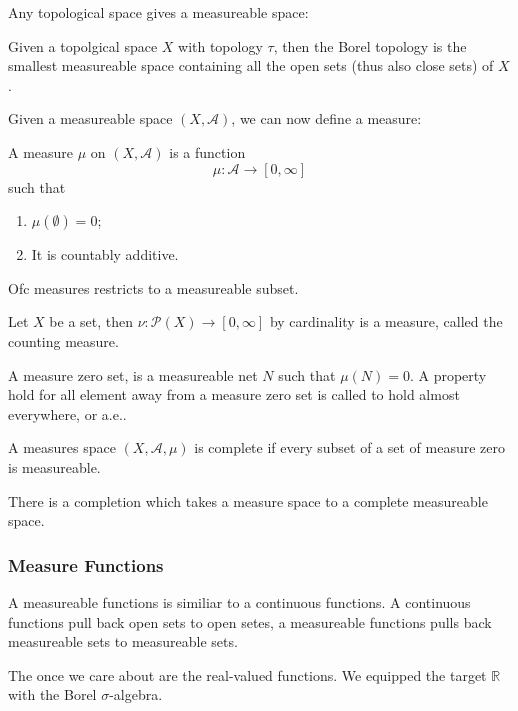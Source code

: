 \documentclass[main.tex]{subfiles}
\begin{document}
Any topological space gives a measureable space:

\begin{definition}
Given a topolgical space $X$ with topology $\tau$, then the Borel topology is the smallest measureable space containing all the open sets (thus also close sets) of $X$. 
\end{definition}

Given a measureable space $(X, \mathcal{A})$, we can now define a measure:

\begin{definition}
A measure $\mu$ on $(X, \mathcal{A})$ is a function 
$$
\mu: \mathcal{A} \rightarrow [0, \infty]
$$
such that 
\begin{enumerate}
    \item $\mu(\emptyset) = 0$;
    \item It is countably additive.
\end{enumerate}
\end{definition}

Ofc measures restricts to a measureable subset. 

\begin{example}
Let $X$ be a set, then $\nu: \mathcal{P}(X) \rightarrow [0, \infty]$ by cardinality is a measure, called the counting measure. 
\end{example}

A measure zero set, is a measureable net $N$ such that $\mu(N) = 0$. A property hold for all element away from a measure zero set is called to hold almost everywhere, or a.e..

\begin{definition}
A measures space $(X, \mathcal{A}, \mu)$ is complete if every subset of a set of measure zero is measureable.
\end{definition}

There is a completion which takes a measure space to a complete measureable space.

\subsubsection{Measure Functions}
A measureable functions is similiar to a continuous functions. A continuous functions pull back open sets to open setes, a measureable functions pulls back measureable sets to measureable sets.


The once we care about are the real-valued functions. We equipped the target $\mathbb{R}$ with the Borel $\sigma$-algebra. 
\end{document}
